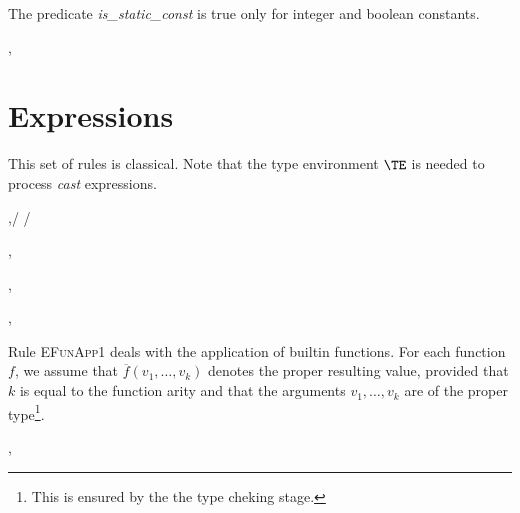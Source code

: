 The predicate \emph{is\_static\_const} is true only for integer and boolean constants.

\infrule[FunDecl]
{}
{\TE,\EE \vdash {}~~\txt{=}~~\rightarrow~ }


\section{Expressions}
\label{sec:static-expressions}

This set of rules is classical.
Note that the type environment $\TE$ is needed to process \emph{cast} expressions.


\infrule[EConst]
{}
{\TE,\EE \vdash {}/ \gives {}/}


{\TE,\EE \vdash {} \gives \vv}

{\TE,\EE \vdash {}~ \gives {}~\tuplen{\vv}}

{\TE,\EE \vdash {}~\mathbf{(}\mathbf{)} \gives \vv}

Rule \textsc{EFunApp1} deals with the application of builtin functions. 
For each function $f$, we assume that $\overline{f}(v_1,\dots,v_k)$ denotes the proper
resulting value, provided that $k$ is equal to the function arity and
that the arguments $v_1,\dots,v_k$ are of the proper type\footnote{This is ensured by the
  the type cheking stage.}.

{\TE,\EE \vdash {}~\mathbf{(}\mathbf{)} \gives \vv}

